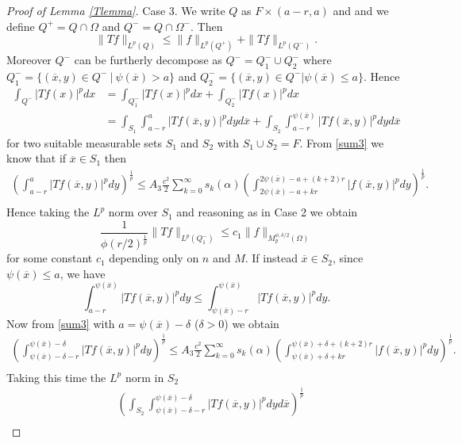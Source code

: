 \documentclass[12pt]{article}
\theoremstyle{definition}
\begin{document}
\begin{proof}[Proof of Lemma \ref{Tlemma}]
Case 3. We write $Q$ as $F \times (a-r,a)$ and and we define $Q^+=Q\cap\Omega$ and $Q^-=Q\cap\Omega^-.$ Then 
\[\|Tf\|_{L^p(Q)}\le\|f\|_{L^p(Q^+)}+\|Tf\|_{L^p(Q^-)}.\]
Moreover $Q^-$ can be furtherly decompose as $Q^-=Q^-_1 \cup Q^-_2$ where $Q^-_1=\{ (\overline x,y) \in Q^- \ | \ \psi(\overline x)>a \}$ and $Q^-_2=\{ (\overline x,y) \in Q^- | \psi(\overline x)\le a \}$. Hence
\begin{align*} \int_{Q^-} |Tf(x)|^pdx &= \int_{Q^-_1} |Tf(x)|^pdx +\int_{Q^-_2} |Tf(x)|^pdx\\
&=\int_{S_1} \int_{a-r}^{a} |Tf(\overline x,y)|^pdy d\overline x+\int_{S_2} \int_{a-r}^{\psi(\overline x)} |Tf(\overline x,y)|^pdy d\overline x
\end{align*}
for two suitable measurable sets $S_1$ and $S_2$ with $S_1 \cup S_2 = F.$ From \eqref{sum3} we know that if $\overline x \in S_1$ then
\begin{align*}
 \left(\int_{a-r}^{a}|Tf(\overline x,y)|^p dy\right)^{\frac{1}{p}} \le A_3\frac{c^2}{2} \sum_{k=0}^\infty s_k(\alpha) \left ( \int_{2\psi(\overline x) -a +kr}^{2\psi(\overline x) -a +(k+2)r}|f(\overline x, y)|^p  dy \right) ^{\frac{1}{p}}. \\
\end{align*}
Hence taking the $L^p$ norm over $S_1$ and reasoning as in Case 2 we obtain
\begin{equation}
\frac{1}{\phi(r/2)^{\frac{1}{p}}} \| Tf\|_{L^p(Q^-_1)} \le c_1 \| f\|_{M_p^{\phi,\delta/2}(\Omega)} \label{q1}
\end{equation}
for some constant $c_1$ depending only on $n$ and $M$. If instead $\overline x \in S_2$, since $\psi(\overline x)\le a$, we have
\begin{equation}
\int_{a-r}^{\psi(\overline x)} |Tf(\overline x,y)|^pdy \le \int_{\psi(\overline x)-r}^{\psi(\overline x)} |Tf(\overline x,y)|^pdy. \label{psia}
\end{equation}
Now from \eqref{sum3} with $a=\psi(\overline x)-\delta$ ($\delta>0$) we obtain
\begin{align*}
 \left(\int_{\psi(\overline x)-\delta-r}^{\psi(\overline x)-\delta}|Tf(\overline x,y)|^p dy\right)^{\frac{1}{p}} \le A_3\frac{c^2}{2} \sum_{k=0}^\infty s_k(\alpha) \left ( \int_{\psi(\overline x) +\delta +kr}^{\psi(\overline x) +\delta +(k+2)r}|f(\overline x, y)|^p  dy \right) ^{\frac{1}{p}}. \\
\end{align*}
Taking this time the $L^p$ norm in $S_2$ 
\begin{align*}
&\left(\int_{S_2}\int_{\psi(\overline x)-\delta-r}^{\psi(\overline x)-\delta}|Tf(\overline x,y)|^p dy d\overline x\right)^{\frac{1}{p}} \\

\end{align*}
\end{proof}
\end{document}
